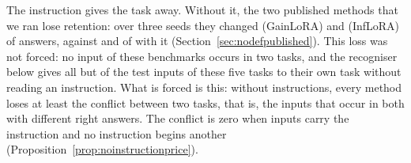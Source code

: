 The instruction gives the task away. Without it, the two published methods that we ran lose
retention: over three seeds they changed \AudSeedsGainloraChanged{} (GainLoRA) and
\AudSeedsInfloraChanged{} (InfLoRA) of \AudSeedsCompared{} answers, against \FiveGainChanged{} and
\FiveInfChanged{} of \FiveGainCompared{} with it (Section~\ref{sec:nodefpublished}). This loss was not forced:
no input of these benchmarks occurs in two tasks, and the recogniser below gives all but
\AudRouteFiveRidgeNotOwn{} of the \AudRouteFiveRidgeN{} test inputs of these five tasks to their own
task without reading an instruction. What is forced is this: without instructions, every method
loses at least the conflict between two tasks, that is, the inputs that occur in both with
different right answers. The conflict is zero when inputs carry the instruction and no instruction
begins another (Proposition~\ref{prop:noinstructionprice}).

